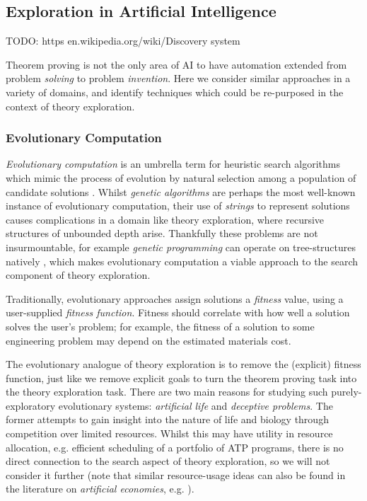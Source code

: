 \documentclass[]{article}
\begin{document}
\subsection{Exploration in Artificial Intelligence}

TODO: https en.wikipedia.org/wiki/Discovery system

Theorem proving is not the only area of AI to have automation extended from problem \emph{solving} to problem \emph{invention}. Here we consider similar approaches in a variety of domains, and identify techniques which could be re-purposed in the context of theory exploration.

\subsubsection{Evolutionary Computation}

\emph{Evolutionary computation} is an umbrella term for heuristic search algorithms which mimic the process of evolution by natural selection among a population of candidate solutions \cite{back1997evolutionary}. Whilst \emph{genetic algorithms} are perhaps the most well-known instance of evolutionary computation, their use of \emph{strings} to represent solutions causes complications in a domain like theory exploration, where recursive structures of unbounded depth arise. Thankfully these problems are not insurmountable, for example \emph{genetic programming} can operate on tree-structures natively \cite{banzhaf1998genetic}, which makes evolutionary computation a viable approach to the search component of theory exploration.

Traditionally, evolutionary approaches assign solutions a \emph{fitness} value, using a user-supplied \emph{fitness function}. Fitness should correlate with how well a solution solves the user's problem; for example, the fitness of a solution to some engineering problem may depend on the estimated materials cost.

The evolutionary analogue of theory exploration is to remove the (explicit) fitness function, just like we remove explicit goals to turn the theorem proving task into the theory exploration task. There are two main reasons for studying such purely-exploratory evolutionary systems: \emph{artificial life} and \emph{deceptive problems}. The former attempts to gain insight into the nature of life and biology through competition over limited resources. Whilst this may have utility in resource allocation, e.g. efficient scheduling of a portfolio of ATP programs, there is no direct connection to the search aspect of theory exploration, so we will not consider it further (note that similar resource-usage ideas can also be found in the literature on \emph{artificial economies}, e.g. \cite{baum2000evolution}).
\end{document}
